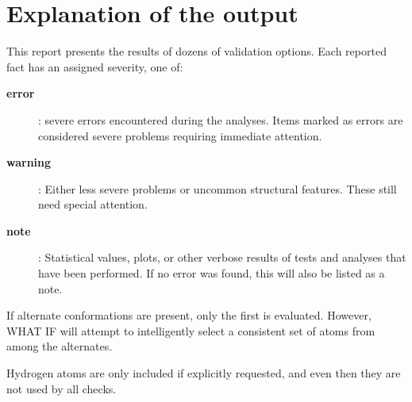 %
%
\appendix
\section{Explanation of the output}
This report presents the results of dozens of validation options.
Each reported fact has an assigned severity, one of:
\begin{description}
\item[{\bf error}]: severe errors encountered during the analyses. Items
   marked as errors are considered severe problems requiring immediate
   attention.
\item[{\bf warning}]: Either less severe problems or uncommon structural
   features. These still need special attention.
\item[{\bf note}]: Statistical values, plots, or other verbose results of
   tests and analyses that have been performed. If no error was found, this
   will also be listed as a note.
\end{description}

If alternate conformations are present, only the first is evaluated.
However, WHAT IF will attempt to intelligently select a consistent set
of atoms from among the alternates.

Hydrogen atoms are only included if explicitly requested, and even then
they are not used by all checks.

